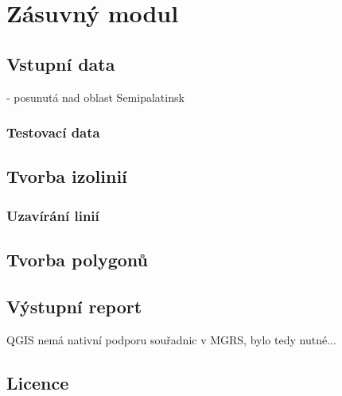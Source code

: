 \chapter{Zásuvný modul}
\label{4-plugin}

\section{Vstupní data}
- posunutá nad oblast Semipalatinsk
\subsection{Testovací data}

\section{Tvorba izolinií}

\subsection{Uzavírání linií}


\section{Tvorba polygonů}

\section{Výstupní report}
QGIS nemá nativní podporu souřadnic v MGRS, bylo tedy nutné...

\section{Licence}